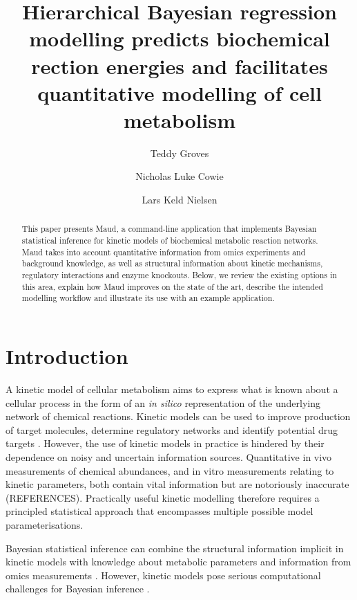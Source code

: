 \documentclass[journal=,manuscript=]{achemso}
\author{Teddy Groves}
\affiliation{ DTU Biosustain,  }
\author{Nicholas Luke Cowie}
\affiliation{ DTU Biosustain,  }
\author{Lars Keld Nielsen}
\affiliation{ DTU Biosustain,  }
\title[]{Hierarchical Bayesian regression modelling predicts biochemical
rection energies and facilitates quantitative modelling of cell
metabolism}
\renewcommand*\contentsname{Table of contents}
\newcommand\contentsname{Table of contents}
\begin{document}
\maketitle
\begin{abstract}
This paper presents Maud, a command-line application that implements
Bayesian statistical inference for kinetic models of biochemical
metabolic reaction networks. Maud takes into account quantitative
information from omics experiments and background knowledge, as well as
structural information about kinetic mechanisms, regulatory interactions
and enzyme knockouts. Below, we review the existing options in this
area, explain how Maud improves on the state of the art, describe the
intended modelling workflow and illustrate its use with an example
application.
\end{abstract}
\ifdefined\Shaded\renewenvironment{Shaded}{\begin{tcolorbox}[interior hidden, frame hidden, breakable, sharp corners, boxrule=0pt, borderline west={3pt}{0pt}{shadecolor}, enhanced]}{\end{tcolorbox}}\fi

\renewcommand*\contentsname{Table of contents}
{
\hypersetup{linkcolor=}
\setcounter{tocdepth}{3}
\tableofcontents
}
\hypertarget{introduction}{%
\section{Introduction}\label{introduction}}

A kinetic model of cellular metabolism aims to express what is known
about a cellular process in the form of an \emph{in silico}
representation of the underlying network of chemical reactions. Kinetic
models can be used to improve production of target molecules, determine
regulatory networks \citep{christodoulou_reserve_2018} and identify
potential drug targets
\citep{deberardinis_fundamentals_2016, Liberti2017}. However, the use of
kinetic models in practice is hindered by their dependence on noisy and
uncertain information sources. Quantitative in vivo measurements of
chemical abundances, and in vitro measurements relating to kinetic
parameters, both contain vital information but are notoriously
inaccurate (REFERENCES). Practically useful kinetic modelling therefore
requires a principled statistical approach that encompasses multiple
possible model parameterisations.

Bayesian statistical inference can combine the structural information
implicit in kinetic models with knowledge about metabolic parameters and
information from omics measurements
\citep{saa_construction_2016, gopalakrishnan_k-fit_2020}. However,
kinetic models pose serious computational challenges for Bayesian
inference \citep{gutenkunst_2007, raue_identifiability_2010}.
\end{document}
